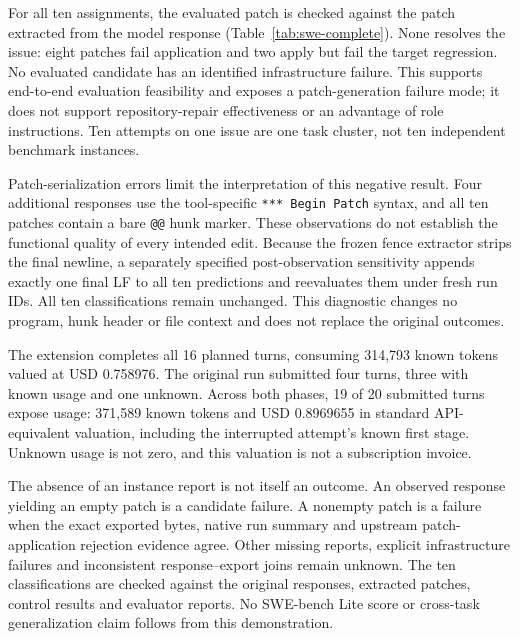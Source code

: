 For all ten assignments, the evaluated patch is checked against the patch extracted from the model response (Table~\ref{tab:swe-complete}). None resolves the issue: eight patches fail application and two apply but fail the target regression. No evaluated candidate has an identified infrastructure failure. This supports end-to-end evaluation feasibility and exposes a patch-generation failure mode; it does not support repository-repair effectiveness or an advantage of role instructions. Ten attempts on one issue are one task cluster, not ten independent benchmark instances.

Patch-serialization errors limit the interpretation of this negative result. Four additional responses use the tool-specific \texttt{*** Begin Patch} syntax, and all ten patches contain a bare \texttt{@@} hunk marker. These observations do not establish the functional quality of every intended edit. Because the frozen fence extractor strips the final newline, a separately specified post-observation sensitivity appends exactly one final LF to all ten predictions and reevaluates them under fresh run IDs. All ten classifications remain unchanged. This diagnostic changes no program, hunk header or file context and does not replace the original outcomes.

The extension completes all 16 planned turns, consuming 314,793 known tokens valued at USD 0.758976. The original run submitted four turns, three with known usage and one unknown. Across both phases, 19 of 20 submitted turns expose usage: 371,589 known tokens and USD 0.8969655 in standard API-equivalent valuation, including the interrupted attempt's known first stage. Unknown usage is not zero, and this valuation is not a subscription invoice.

The absence of an instance report is not itself an outcome. An observed response yielding an empty patch is a candidate failure. A nonempty patch is a failure when the exact exported bytes, native run summary and upstream patch-application rejection evidence agree. Other missing reports, explicit infrastructure failures and inconsistent response--export joins remain unknown. The ten classifications are checked against the original responses, extracted patches, control results and evaluator reports. No SWE-bench Lite score or cross-task generalization claim follows from this demonstration.

